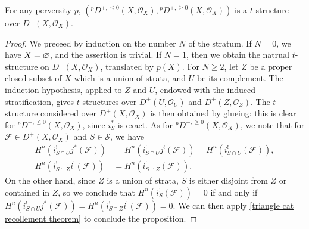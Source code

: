 \begin{proposition}\label{stratified space perverse t-structure on D^+}
For any perversity $p$, $({^p\!D^{+,\leq 0}}(X,\mathscr{O}_X),{^p\!D^{+,\geq 0}}(X,\mathscr{O}_X))$ is a $t$-structure over $D^+(X,\mathscr{O}_X)$.
\end{proposition}
\begin{proof}
We preceed by induction on the number $N$ of the stratum. If $N=0$, we have $X=\varnothing$, and the assertion is trivial. If $N=1$, then we obtain the natrual $t$-structure on $D^+(X,\mathscr{O}_X)$, translated by $p(X)$. For $N\geq 2$, let $Z$ be a proper closed subset of $X$ which is a union of strata, and $U$ be its complement. The induction hypothesis, applied to $Z$ and $U$, endowed with the induced stratification, gives $t$-structures over $D^+(U,\mathscr{O}_U)$ and $D^+(Z,\mathscr{O}_Z)$. The $t$-structure considered over $D^+(X,\mathscr{O}_X)$ is then obtained by glueing: this is clear for ${^p\!D^{+,\leq 0}}(X,\mathscr{O}_X)$, since $i_S^*$ is exact. As for ${^p\!D^{+,\geq 0}}(X,\mathscr{O}_X)$, we note that for $\mathscr{F}\in D^+(X,\mathscr{O}_X)$ and $S\in\mathcal{S}$, we have
\begin{align*}
H^n(i_{S\cap U}^!j^*(\mathscr{F}))&=H^n(i_{S\cap U}^!j^!(\mathscr{F}))=H^n(i_{S\cap U}^!(\mathscr{F})),\\
H^n(i_{S\cap Z}^!i^!(\mathscr{F}))&=H^n(i_{S\cap Z}^!(\mathscr{F})).
\end{align*}
On the other hand, since $Z$ is a union of strata, $S$ is either disjoint from $Z$ or contained in $Z$, so we conclude that $H^n(i_S^!(\mathscr{F}))=0$ if and only if $H^n(i_{S\cap U}^!j^*(\mathscr{F}))=H^n(i_{S\cap Z}^!i^!(\mathscr{F}))=0$. We can then apply \cref{triangle cat recollement theorem} to conclude the proposition.
\end{proof}

